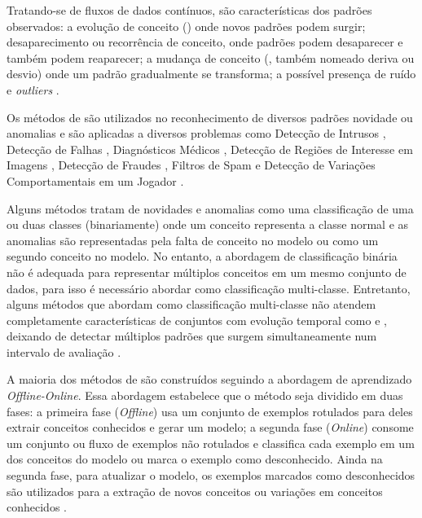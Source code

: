 
Tratando-se de fluxos de dados contínuos, são características dos padrões observados:
a evolução de conceito (\evolution) onde novos padrões podem surgir;
desaparecimento ou recorrência de conceito, onde padrões podem desaparecer e
também podem reaparecer;
a mudança de conceito (\drift, também nomeado deriva ou desvio) onde um padrão
gradualmente se transforma;
a possível presença de ruído e \emph{outliers} \cite{Gama2010}.


Os métodos de \nd são utilizados no reconhecimento de diversos padrões novidade
ou anomalias e são aplicadas a diversos problemas como
Detecção de Intrusos \cite{Coull2003,Spinosa2008,Viegas2019,Cassales2019a},
Detecção de Falhas \cite{Zhang2006},
Diagnósticos Médicos \cite{Perner2009},
Detecção de Regiões de Interesse em Imagens \cite{singh2004approach},
Detecção de Fraudes \cite{wang2003mining,Abdallah201690}, 
Filtros de Spam \cite{Hayat2010dct} e
Detecção de Variações Comportamentais em um Jogador \cite{Vallim20136258}.


Alguns métodos tratam de novidades e anomalias como uma classificação de uma
ou duas classes (binariamente) onde um conceito representa a classe normal e
as anomalias são representadas pela falta de conceito no modelo ou
como um segundo conceito no modelo.
No entanto, a abordagem de classificação binária não é adequada para representar
múltiplos conceitos em um mesmo conjunto de dados, para isso é necessário abordar
\nd como classificação multi-classe.
Entretanto, alguns métodos que abordam \nd como classificação multi-classe não
atendem completamente características de conjuntos com evolução temporal
como \evolution e \drift, deixando de detectar múltiplos padrões que surgem
simultaneamente num intervalo de avaliação \cite{Faria2016nd,Gama2010}.

A maioria dos métodos de \nd são construídos seguindo a abordagem de aprendizado
\emph{Offline-Online}. Essa abordagem estabelece que o método seja dividido em
duas fases:
a primeira fase (\emph{Offline}) usa um conjunto de exemplos rotulados para
deles extrair conceitos conhecidos e gerar um modelo;
a segunda fase (\emph{Online}) consome um conjunto ou fluxo de exemplos não
rotulados e classifica cada exemplo em um dos conceitos do modelo ou marca o
exemplo como desconhecido.
Ainda na segunda fase, para atualizar o modelo, os exemplos marcados como
desconhecidos são utilizados para a extração de novos conceitos ou variações em
conceitos conhecidos \cite{Gama2010}.

